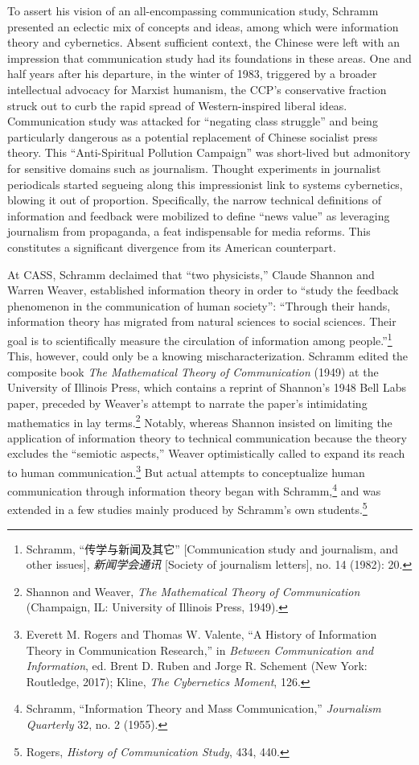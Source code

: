 \documentclass{tufte-handout}
\begin{document}
\begin{CJK*}{UTF8}{gbsn} 

To assert his vision of an all-encompassing communication study, Schramm
presented an eclectic mix of concepts and ideas, among which were
information theory and cybernetics. Absent sufficient context, the
Chinese were left with an impression that communication study had its
foundations in these areas. One and half years after his departure, in
the winter of 1983, triggered by a broader intellectual advocacy for
Marxist humanism, the CCP's conservative fraction struck out to curb the
rapid spread of Western-inspired liberal ideas. Communication study was
attacked for ``negating class struggle'' and being particularly
dangerous as a potential replacement of Chinese socialist press theory.
This ``Anti-Spiritual Pollution Campaign'' was short-lived but
admonitory for sensitive domains such as journalism. Thought experiments
in journalist periodicals started segueing along this impressionist link
to systems cybernetics, blowing it out of proportion. Specifically, the
narrow technical definitions of information and feedback were mobilized
to define ``news value'' as leveraging journalism from propaganda, a
feat indispensable for media reforms. This constitutes a significant
divergence from its American counterpart.

At CASS, Schramm declaimed that ``two physicists,'' Claude Shannon and
Warren Weaver, established information theory in order to ``study the
feedback phenomenon in the communication of human society'': ``Through
their hands, information theory has migrated from natural sciences to
social sciences. Their goal is to scientifically measure the circulation
of information among people.''\footnote{Schramm, ``传学与新闻及其它''
  {[}Communication study and journalism, and other issues{]},
  \emph{新闻学会通讯} {[}Society of journalism letters{]}, no. 14
  (1982): 20.} This, however, could only be a knowing
mischaracterization. Schramm edited the composite book \emph{The
Mathematical Theory of Communication} (1949) at the University of
Illinois Press, which contains a reprint of Shannon's 1948 Bell Labs
paper, preceded by Weaver's attempt to narrate the paper's intimidating
mathematics in lay terms.\footnote{Shannon and Weaver, \emph{The
  Mathematical Theory of Communication} (Champaign, IL: University of
  Illinois Press, 1949).} Notably, whereas Shannon insisted on limiting
the application of information theory to technical communication because
the theory excludes the ``semiotic aspects,'' Weaver optimistically
called to expand its reach to human communication.\footnote{Everett M.
  Rogers and Thomas W. Valente, ``A History of Information Theory in
  Communication Research,'' in \emph{Between Communication and
  Information}, ed. Brent D. Ruben and Jorge R. Schement (New York:
  Routledge, 2017); Kline, \emph{The Cybernetics Moment}, 126.} But
actual attempts to conceptualize human communication through information
theory began with Schramm,\footnote{Schramm, ``Information Theory and
  Mass Communication,'' \emph{Journalism Quarterly} 32, no. 2 (1955).}
and was extended in a few studies mainly produced by Schramm's own
students.\footnote{Rogers, \emph{History of Communication Study}, 434,
  440.}
  

\end{CJK*}
\end{document}
